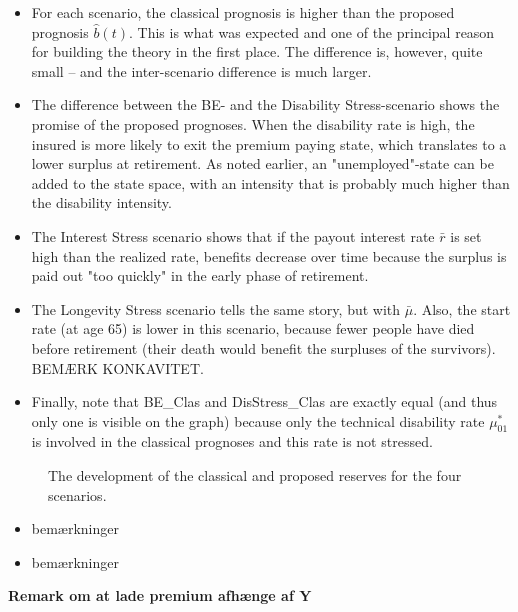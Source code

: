 \documentclass{book}
\newcommand{\1}[1]{\mathbbm{1}_{\left\lbrace #1 \right\rbrace}}
\theoremstyle{break}
\theoremstyle{remark}
\numberwithin{equation}{section}
\begin{document}
\begin{itemize}
	\item For each scenario, the classical prognosis is higher than the proposed prognosis $\hat{b}(t)$. This is what was expected and one of the principal reason for building the theory in the first place. The difference is, however, quite small -- and the inter-scenario difference is much larger.
	\item The difference between the BE- and the Disability Stress-scenario shows the promise of the proposed prognoses. When the disability rate is high, the insured is more likely to exit the premium paying state, which translates to a lower surplus at retirement. As noted earlier, an "unemployed"-state can be added to the state space, with an intensity that is probably much higher than the disability intensity.
	\item The Interest Stress scenario shows that if the payout interest rate $\bar{r}$ is set high than the realized rate, benefits decrease over time because the surplus is paid out "too quickly" in the early phase of retirement.
	\item The Longevity Stress scenario tells the same story, but with $\bar{\mu}$. Also, the start rate (at age 65) is lower in this scenario, because fewer people have died before retirement (their death would benefit the surpluses of the survivors). BEMÆRK KONKAVITET.
	\item Finally, note that BE\_Clas and DisStress\_Clas are exactly equal (and thus only one is visible on the graph) because only the technical disability rate $\mu_{01}^*$ is involved in the classical prognoses and this rate is not stressed.
\end{itemize}

\begin{figure}[H]
	\centering
	\caption{The development of the classical and proposed reserves for the four scenarios.}
\end{figure}

\begin{itemize}
	\item bemærkninger
\end{itemize}



\begin{itemize}
	\item bemærkninger
\end{itemize}

\textbf{Remark om at lade premium afhænge af Y}
\end{document}
